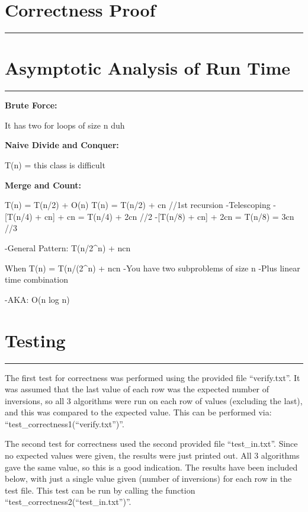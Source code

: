 \documentclass[letterpaper,10pt,titlepage,fleqn]{article}
\begin{document}
\section*{Correctness Proof}
\hrule

\section*{Asymptotic Analysis of Run Time}
\hrule
\begin{centering}
\textbf{Brute Force:}
\end{centering}
It has two for loops of size n duh

\begin{centering}
\textbf{Naive Divide and Conquer:}
\end{centering}
T(n) = this class is difficult

\begin{centering}
\textbf{Merge and Count:}
\end{centering}
T(n) = T(n/2) + O(n) 
T(n) = T(n/2) + cn //1st recursion
    -Telescoping
        -[T(n/4) + cn] + cn = T(n/4) + 2cn //2
          -[T(n/8) + cn] + 2cn = T(n/8) = 3cn //3

    -General Pattern: T(n/2^n) + ncn

    When T(n) = T(n/(2^n) + ncn
        -You have two subproblems of size n
        -Plus linear time combination

        -AKA: O(n log n)


\section*{Testing}
\hrule
The first test for correctness was performed using the provided file ``verify.txt''. It was assumed that the last value of each row was the expected number of inversions, so all 3 algorithms were run on each row of values (excluding the last), and this was compared to the expected value. This can be performed via: ``test\_correctness1(``verify.txt'')''.

The second test for correctness used the second provided file ``test\_in.txt''. Since no expected values were given, the results were just printed out. All 3 algorithms gave the same value, so this is a good indication. The results have been included below, with just a single value given (number of inversions) for each row in the test file. This test can be run by calling the function ``test\_correctness2(``test\_in.txt'')''.
\end{document}
